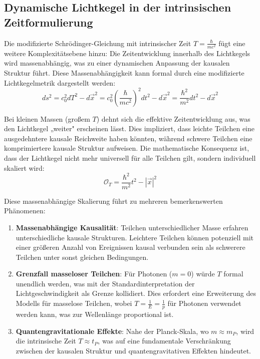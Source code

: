 \documentclass[a4paper,12pt]{article}
\begin{document}
			\subsection{Dynamische Lichtkegel in der intrinsischen Zeitformulierung}
			Die modifizierte Schrödinger-Gleichung mit intrinsischer Zeit \( T = \frac{\hbar}{m c^2} \) fügt eine weitere Komplexitätsebene hinzu: Die Zeitentwicklung innerhalb des Lichtkegels wird massenabhängig, was zu einer dynamischen Anpassung der kausalen Struktur führt. Diese Massenabhängigkeit kann formal durch eine modifizierte Lichtkegelmetrik dargestellt werden:
			\begin{equation}
			ds^2 = c_0^2 dT^2 - d\vec{x}^2 = c_0^2 \left(\frac{\hbar}{m c^2}\right)^2 dt^2 - d\vec{x}^2 = \frac{\hbar^2}{m^2} dt^2 - d\vec{x}^2
			\end{equation}
			
			Bei kleinen Massen (großem \( T \)) dehnt sich die effektive Zeitentwicklung aus, was den Lichtkegel „weiter" erscheinen lässt. Dies impliziert, dass leichte Teilchen eine ausgedehntere kausale Reichweite haben könnten, während schwere Teilchen eine komprimiertere kausale Struktur aufweisen. Die mathematische Konsequenz ist, dass der Lichtkegel nicht mehr universell für alle Teilchen gilt, sondern individuell skaliert wird:
			\begin{equation}
			\mathcal{O}_T = \frac{\hbar^2}{m^2} t^2 - |\vec{x}|^2
			\end{equation}
			
			Diese massenabhängige Skalierung führt zu mehreren bemerkenswerten Phänomenen:
			
			\begin{enumerate}
			\item \textbf{Massenabhängige Kausalität}: Teilchen unterschiedlicher Masse erfahren unterschiedliche kausale Strukturen. Leichtere Teilchen können potenziell mit einer größeren Anzahl von Ereignissen kausal verbunden sein als schwerere Teilchen unter sonst gleichen Bedingungen.
			\item \textbf{Grenzfall masseloser Teilchen}: Für Photonen (\( m = 0 \)) würde \( T \) formal unendlich werden, was mit der Standardinterpretation der Lichtgeschwindigkeit als Grenze kollidiert. Dies erfordert eine Erweiterung des Modells für masselose Teilchen, wobei \( T = \frac{1}{E} = \frac{1}{p} \) für Photonen verwendet werden kann, was zur Wellenlänge proportional ist.
			\item \textbf{Quantengravitationale Effekte}: Nahe der Planck-Skala, wo \( m \approx m_P \), wird die intrinsische Zeit \( T \approx t_P \), was auf eine fundamentale Verschränkung zwischen der kausalen Struktur und quantengravitativen Effekten hindeutet.
			\end{enumerate}
			
\end{document}
